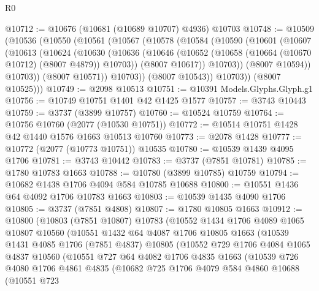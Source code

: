 \begin{lexlean}{R0}
\begin{coremodule}
@10712 := @10676 (@10681 (@10689 @10707) @4936) @10703
@10748 := @10509
    (@10536
      (@10550
        (@10561
          (@10567
            (@10578
              (@10584
                (@10590
                  (@10601
                    (@10607
                      (@10613
                        (@10624
                          (@10630
                            (@10636
                              (@10646
                                (@10652 (@10658 (@10664 (@10670 @10712) (@8007 @4879)) @10703))
                                (@8007 @10617))
                              @10703))
                          (@8007 @10594))
                        @10703))
                    (@8007 @10571))
                  @10703))
              (@8007 @10543))
            @10703))
        (@8007 @10525)))
@10749 := @2098 @10513
@10751 := @10391 Models.Glyphs.Glyph.g1
@10756 := @10749 @10751 @1401 @42 @1425 @1577
@10757 := @3743 @10443
@10759 := @3737 (@3899 @10757)
@10760 := @10524 @10759
@10764 := @10756 @10760 (@2077 (@10530 @10751))
@10772 := @10514 @10751 @1428 @42 @1440 @1576 @1663 @10513 @10760
@10773 := @2078 @1428
@10777 := @10772 (@2077 (@10773 @10751)) @10535
@10780 := @10539 @1439 @4095 @1706
@10781 := @3743 @10442
@10783 := @3737 (@7851 @10781)
@10785 := @1780 @10783 @1663
@10788 := @10780 (@3899 @10785) @10759
@10794 := @10682 @1438 @1706 @4094 @584 @10785 @10688
@10800 := @10551 @1436 @64 @4092 @1706 @10783 @1663
@10803 := @10539 @1435 @4090 @1706
@10805 := @3737 (@7851 @4808)
@10807 := @1780 @10805 @1663
@10912 := @10800
    (@10803
      (@7851 @10807)
      @10783
      (@10552
        @1434
        @1706
        @4089
        @1065
        @10807
        @10560
        (@10551
          @1432
          @64
          @4087
          @1706
          @10805
          @1663
          (@10539
            @1431
            @4085
            @1706
            (@7851 @4837)
            @10805
            (@10552
              @729
              @1706
              @4084
              @1065
              @4837
              @10560
              (@10551
                @727
                @64
                @4082
                @1706
                @4835
                @1663
                (@10539
                  @726
                  @4080
                  @1706
                  @4861
                  @4835
                  (@10682
                    @725
                    @1706
                    @4079
                    @584
                    @4860
                    @10688
                    (@10551
                      @723

\end{coremodule}
\end{lexlean}
